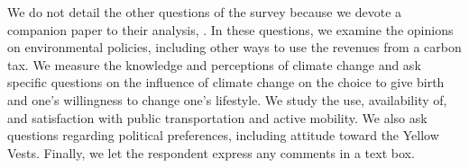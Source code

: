\documentclass[12pt]{article} %
\begin{document}
We do not detail the other questions of the survey because we devote a companion paper to their analysis, \citet{douenne_french_2019}. In these questions, we examine the opinions on environmental policies, including other ways to use the revenues from a carbon tax. We measure the knowledge and perceptions of climate change and ask specific questions on the influence of climate change on the choice to give birth and one's willingness to change one's lifestyle. We study the use, availability of, and satisfaction with public transportation and active mobility. We also ask questions regarding political preferences, including attitude toward the Yellow Vests. Finally, we let the respondent express any comments in a text box.







\end{document}
